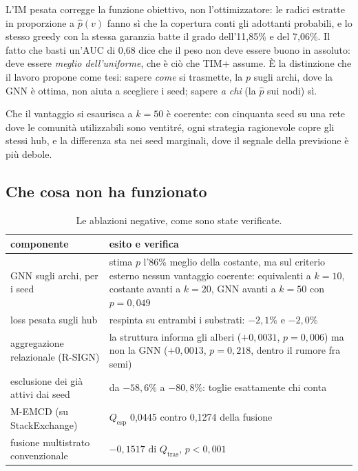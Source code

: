 \documentclass[11pt,a4paper]{article}
\newcommand{\Qtras}{Q_{\mathrm{tras}}}
\newcommand{\Qesp}{Q_{\mathrm{esp}}}
\newcommand{\phat}{\hat{p}}
\newcommand{\sx}{StackExchange}
\begin{document}
L'IM pesata corregge la funzione obiettivo, non l'ottimizzatore: le radici estratte in proporzione a $\phat(v)$ fanno sì che la copertura conti gli adottanti probabili, e lo stesso greedy con la stessa garanzia batte il grado dell'11,85\% e del 7,06\%. Il fatto che basti un'AUC di 0,68 dice che il peso non deve essere buono in assoluto: deve essere \emph{meglio dell'uniforme}, che è ciò che TIM+ assume. È la distinzione che il lavoro propone come tesi: sapere \emph{come} si trasmette, la $p$ sugli archi, dove la GNN è ottima, non aiuta a scegliere i seed; sapere \emph{a chi} (la $\phat$ sui nodi) sì.

Che il vantaggio si esaurisca a $k = 50$ è coerente: con cinquanta seed su una rete dove le comunità utilizzabili sono ventitré, ogni strategia ragionevole copre gli stessi hub, e la differenza sta nei seed marginali, dove il segnale della previsione è più debole.

\subsection{Che cosa non ha funzionato}
\begin{table}[htbp]
  \centering\small
  \caption{Le ablazioni negative, come sono state verificate.}
  \label{tab:negativi}
  \begin{tabular}{p{}p{}}
    \toprule
    componente & esito e verifica \\
    \midrule
    GNN sugli archi, per i seed & stima $p$ l'86\% meglio della costante, ma sul criterio esterno nessun vantaggio coerente: equivalenti a $k=10$, costante avanti a $k=20$, GNN avanti a $k=50$ con $p=0{,}049$ \\
    loss pesata sugli hub & respinta su entrambi i substrati: $-2{,}1\%$ e $-2{,}0\%$ \\
    aggregazione relazionale (R-SIGN) & la struttura informa gli alberi ($+0{,}0031$, $p=0{,}006$) ma non la GNN ($+0{,}0013$, $p=0{,}218$, dentro il rumore fra semi) \\
    esclusione dei già attivi dai seed & da $-58{,}6\%$ a $-80{,}8\%$: toglie esattamente chi conta \\
    M-EMCD (su \sx{}) & $\Qesp$ 0,0445 contro 0,1274 della fusione \\
    fusione multistrato convenzionale & $-0{,}1517$ di $\Qtras$, $p<0{,}001$ \\
    \bottomrule
  \end{tabular}
\end{table}
\end{document}
